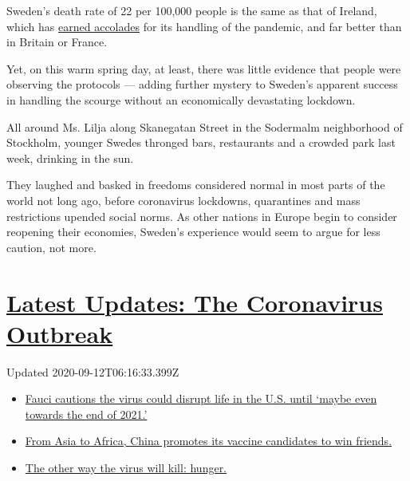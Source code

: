 Sweden's death rate of 22 per 100,000 people is the same as that of
Ireland, which has
\href{https://www.nytimes3xbfgragh.onion/2020/04/11/world/europe/ireland-leo-varadkar-coronavirus.html}{earned
accolades} for its handling of the pandemic, and far better than in
Britain or France.

Yet, on this warm spring day, at least, there was little evidence that
people were observing the protocols --- adding further mystery to
Sweden's apparent success in handling the scourge without an
economically devastating lockdown.

All around Ms. Lilja along Skanegatan Street in the Sodermalm
neighborhood of Stockholm, younger Swedes thronged bars, restaurants and
a crowded park last week, drinking in the sun.

They laughed and basked in freedoms considered normal in most parts of
the world not long ago, before coronavirus lockdowns, quarantines and
mass restrictions upended social norms. As other nations in Europe begin
to consider reopening their economies, Sweden's experience would seem to
argue for less caution, not more.

\hypertarget{latest-updates-the-coronavirus-outbreak}{%
\section{\texorpdfstring{\href{https://www.nytimes3xbfgragh.onion/2020/09/11/world/covid-19-coronavirus.html?action=click\&pgtype=Article\&state=default\&region=MAIN_CONTENT_1\&context=storylines_live_updates}{Latest
Updates: The Coronavirus
Outbreak}}{Latest Updates: The Coronavirus Outbreak}}\label{latest-updates-the-coronavirus-outbreak}}

Updated 2020-09-12T06:16:33.399Z

\begin{itemize}
\tightlist
\item
  \href{https://www.nytimes3xbfgragh.onion/2020/09/11/world/covid-19-coronavirus.html?action=click\&pgtype=Article\&state=default\&region=MAIN_CONTENT_1\&context=storylines_live_updates\#link-dfb8a16}{Fauci
  cautions the virus could disrupt life in the U.S. until `maybe even
  towards the end of 2021.'}
\item
  \href{https://www.nytimes3xbfgragh.onion/2020/09/11/world/covid-19-coronavirus.html?action=click\&pgtype=Article\&state=default\&region=MAIN_CONTENT_1\&context=storylines_live_updates\#link-7104d154}{From
  Asia to Africa, China promotes its vaccine candidates to win friends.}
\item
  \href{https://www.nytimes3xbfgragh.onion/2020/09/11/world/covid-19-coronavirus.html?action=click\&pgtype=Article\&state=default\&region=MAIN_CONTENT_1\&context=storylines_live_updates\#link-393ad215}{The
  other way the virus will kill: hunger.}
\end{itemize}


